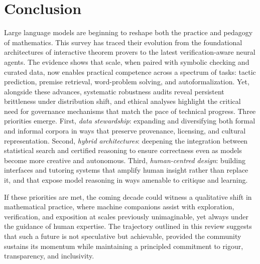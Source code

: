 \documentclass[acmsmall,anonymous]{acmart}
\begin{document}
\section{Conclusion}\label{sec:conclusion}

Large language models are beginning to reshape both the practice and pedagogy of mathematics.  This survey has traced their evolution from the foundational architectures of interactive theorem provers to the latest verification-aware neural agents.  The evidence shows that scale, when paired with symbolic checking and curated data, now enables practical competence across a spectrum of tasks: tactic prediction, premise retrieval, word-problem solving, and autoformalization.  Yet, alongside these advances, systematic robustness audits reveal persistent brittleness under distribution shift, and ethical analyses highlight the critical need for governance mechanisms that match the pace of technical progress.
Three priorities emerge.  First, \emph{data stewardship}: expanding and diversifying both formal and informal corpora in ways that preserve provenance, licensing, and cultural representation.  Second, \emph{hybrid architectures}: deepening the integration between statistical search and certified reasoning to ensure correctness even as models become more creative and autonomous.  Third, \emph{human-centred design}: building interfaces and tutoring systems that amplify human insight rather than replace it, and that expose model reasoning in ways amenable to critique and learning.

If these priorities are met, the coming decade could witness a qualitative shift in mathematical practice, where machine companions assist with exploration, verification, and exposition at scales previously unimaginable, yet always under the guidance of human expertise.  The trajectory outlined in this review suggests that such a future is not speculative but achievable, provided the community sustains its momentum while maintaining a principled commitment to rigour, transparency, and inclusivity.
\end{document}
